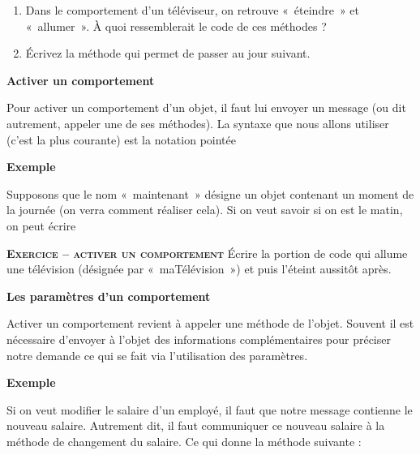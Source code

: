 \liststyleWWviiiNumi
\begin{enumerate}
\item {
Dans le comportement d'un téléviseur, on retrouve
«~éteindre~» et «~allumer~». À quoi ressemblerait le code de ces
méthodes ?}
\item {
Écrivez la méthode qui permet de passer au jour suivant.}
\end{enumerate}

\bigskip

{\sffamily\bfseries
Activer un comportement}

{
Pour activer un comportement d'un objet, il faut lui
envoyer un message (ou dit autrement, appeler une de ses méthodes). La
syntaxe que nous allons utiliser (c'est la plus
courante) est la notation pointée}


{\bfseries
Exemple}

{
Supposons que le nom «~maintenant~» désigne un objet contenant un moment
de la journée (on verra comment réaliser cela). Si on veut savoir si on
est le matin, on peut écrire}



\bigskip

{\sffamily\bfseries\scshape
Exercice – activer un comportement}
{
Écrire la portion de code qui allume une télévision (désignée par
«~maTélévision~») et puis l'éteint aussitôt après.}


\bigskip

{\sffamily\bfseries\upshape
Les paramètres d'un comportement}

{
Activer un comportement revient à appeler une méthode de
l'objet. Souvent il est nécessaire
d'envoyer à l'objet des informations
complémentaires pour préciser notre demande ce qui se fait via
l'utilisation des paramètres.}

{\bfseries
Exemple}

{
Si on veut modifier le salaire d'un employé, il faut
que notre message contienne le nouveau salaire. Autrement dit, il faut
communiquer ce nouveau salaire à la méthode de changement du salaire.
Ce qui donne la méthode suivante :}


